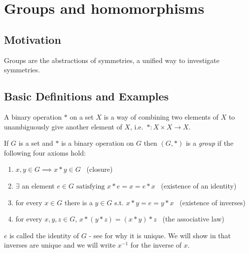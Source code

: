 \section{Groups and homomorphisms}

\hypertarget{motivation}{%
\subsection{Motivation}\label{motivation}}

Groups are the abstractions of symmetries, a unified way to investigate symmetries.

\hypertarget{basic-definitions-and-examples}{%
\subsection{Basic Definitions and Examples}\label{basic-definitions-and-examples}}

\begin{definition}
  A binary operation $*$ on a set \(X\) is a way of combining two elements of \(X\) to unambiguously give another element of \(X\),
i.e.~\(*: X \times X \to X\).
\end{definition} 

\begin{definition}[Group]

If \(G\) is a set and \(*\) is a binary operation on \(G\) then \((G, *)\) is a \emph{group} if the following four axioms hold:

\begin{enumerate}
\def\labelenumi{\arabic{enumi}.}
\item
  \(x, y \in G \implies x * y \in G\) \hfill~{(closure)}
\item
  \(\exists\) an element \(e \in G \text{ satisfying } x * e = x = e * x\) \hfill~{(existence of an identity)}
\item
  for every \(x \in G\) there is a \(y \in G\) s.t. \(x * y = e = y * x\) \hfill~{(existence of inverses)}
\item
  for every \(x, y, z \in G\), \(x * (y * z) = (x * y) * z\) \hfill~{(the associative law)}
\end{enumerate}

\end{definition}

\begin{remark}
\(e\) is called the identity of \(G\) - see  for why it is unique.
We will show in  that inverses are unique and we will write \(x^{-1}\) for the inverse of \(x\).
\end{remark}

